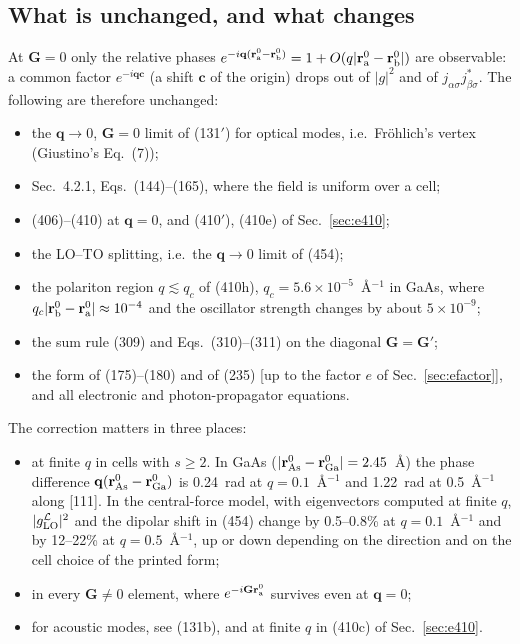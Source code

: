 \documentclass[11pt]{article}
\begin{document}
\subsection{What is unchanged, and what changes}
At $\mathbf G=0$ only the relative phases $e^{-i\mathbf q(\mathbf r^0_{\rm a}-\mathbf r^0_{\rm b})}
=1+O(q|\mathbf r^0_{\rm a}-\mathbf r^0_{\rm b}|)$ are observable: a common factor $e^{-i\mathbf q\mathbf c}$ (a
shift $\mathbf c$ of the origin) drops out of $|g|^2$ and of $j_{\alpha\sigma}j^*_{\beta\sigma}$. The following
are therefore unchanged:
\begin{itemize}
\item the $\mathbf q\to0$, $\mathbf G=0$ limit of (131$'$) for optical modes, i.e.\ Fr\"ohlich's vertex
(Giustino's Eq.~(7));
\item Sec.~4.2.1, Eqs.~(144)--(165), where the field is uniform over a cell;
\item (406)--(410) at $\mathbf q=0$, and (410$'$), (410e) of Sec.~\ref{sec:e410};
\item the LO--TO splitting, i.e.\ the $\mathbf q\to0$ limit of (454);
\item the polariton region $q\lesssim q_c$ of (410h), $q_c=5.6\times10^{-5}$~\AA$^{-1}$ in GaAs, where
$q_c|\mathbf r^0_{\rm b}-\mathbf r^0_{\rm a}|\approx10^{-4}$ and the oscillator strength changes by about
$5\times10^{-9}$;
\item the sum rule (309) and Eqs.~(310)--(311) on the diagonal $\mathbf G=\mathbf G'$;
\item the form of (175)--(180) and of (235) [up to the factor $e$ of Sec.~\ref{sec:efactor}], and all
electronic and photon-propagator equations.
\end{itemize}
The correction matters in three places:
\begin{itemize}
\item at finite $q$ in cells with $s\ge2$. In GaAs ($|\mathbf r^0_{\rm As}-\mathbf r^0_{\rm Ga}|=2.45$~\AA) the
phase difference $\mathbf q(\mathbf r^0_{\rm As}-\mathbf r^0_{\rm Ga})$ is 0.24~rad at $q=0.1$~\AA$^{-1}$ and
1.22~rad at 0.5~\AA$^{-1}$ along [111]. In the central-force model, with eigenvectors computed at finite
$q$, $|g^{\mathcal L}_{\rm LO}|^2$ and the dipolar shift in (454) change by 0.5--0.8\% at
$q=0.1$~\AA$^{-1}$ and by 12--22\% at $q=0.5$~\AA$^{-1}$, up or down depending on the direction and on
the cell choice of the printed form;
\item in every $\mathbf G\neq0$ element, where $e^{-i\mathbf G\mathbf r^0_{\rm a}}$ survives even at
$\mathbf q=0$;
\item for acoustic modes, see (131b), and at finite $q$ in (410c) of Sec.~\ref{sec:e410}.
\end{itemize}
\end{document}
